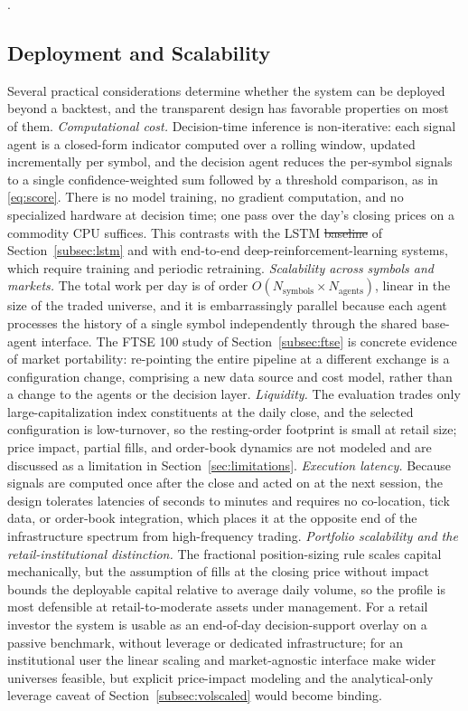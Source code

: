 \documentclass{ieeeaccess}
\providecommand{\DIFaddtex}[1]{{\protect\color{blue}\uwave{#1}}} %
\providecommand{\DIFdeltex}[1]{{\protect\color{red}\sout{#1}}}                      %
\providecommand{\DIFaddbegin}{} %
\providecommand{\DIFaddend}{} %
\providecommand{\DIFdelbegin}{} %
\providecommand{\DIFdelend}{} %
\providecommand{\DIFadd}[1]{\texorpdfstring{\DIFaddtex{#1}}{#1}} %
\providecommand{\DIFdel}[1]{\texorpdfstring{\DIFdeltex{#1}}{}} %
\newcommand{\DIFscaledelfig}{0.5}
\newlength{\DIFdelgraphicswidth} %
\newlength{\DIFdelgraphicsheight} %
\newcommand{\DIFaddincludegraphics}[2][]{{\color{blue}\fbox{\DIFOincludegraphics[#1]{#2}}}} %
\newcommand{\DIFdelincludegraphics}[2][]{%
\sbox{\DIFdelgraphicsbox}{\DIFOincludegraphics[#1]{#2}}%
\settoboxwidth{\DIFdelgraphicswidth}{\DIFdelgraphicsbox} %
\settoboxtotalheight{\DIFdelgraphicsheight}{\DIFdelgraphicsbox} %
\scalebox{\DIFscaledelfig}{%
\parbox[b]{\DIFdelgraphicswidth}{\usebox{\DIFdelgraphicsbox}\\[-\baselineskip] \rule{\DIFdelgraphicswidth}{0em}}\llap{\resizebox{\DIFdelgraphicswidth}{\DIFdelgraphicsheight}{%
\setlength{\unitlength}{\DIFdelgraphicswidth}%
\begin{picture}(1,1)%
\thicklines\linethickness{2pt} %
{\color[rgb]{1,0,0}\put(0,0){\framebox(1,1){}}}%
{\color[rgb]{1,0,0}\put(0,0){\line( 1,1){1}}}%
{\color[rgb]{1,0,0}\put(0,1){\line(1,-1){1}}}%
\end{picture}%
}\hspace*{3pt}}} %
} %
\DeclareRobustCommand{\DIFaddbegin}{\DIFOaddbegin \let\includegraphics\DIFaddincludegraphics} %
\DeclareRobustCommand{\DIFaddend}{\DIFOaddend \let\includegraphics\DIFOincludegraphics} %
\DeclareRobustCommand{\DIFdelbegin}{\DIFOdelbegin \let\includegraphics\DIFdelincludegraphics} %
\DeclareRobustCommand{\DIFdelend}{\DIFOaddend \let\includegraphics\DIFOincludegraphics} %
\begin{document}
\DIFaddbegin \DIFadd{on the risk axis with opaque learned models}\DIFaddend .

\subsection{Deployment and Scalability}
\label{subsec:deployment}

Several practical considerations determine whether the system can be deployed beyond a backtest, and the transparent design has favorable properties on most of them. \emph{Computational cost.} Decision-time inference is non-iterative: each signal agent is a closed-form indicator computed over a rolling window, updated incrementally per symbol, and the decision agent reduces the per-symbol signals to a single confidence-weighted sum followed by a threshold comparison, as in \eqref{eq:score}. There is no model training, no gradient computation, and no specialized hardware at decision time; one pass over the day's closing prices on a commodity CPU suffices. This contrasts with the LSTM \DIFdelbegin \DIFdel{baseline }\DIFdelend \DIFaddbegin \DIFadd{and GBM baselines }\DIFaddend of Section~\ref{subsec:lstm} and with end-to-end deep-reinforcement-learning systems, which require training and periodic retraining. \emph{Scalability across symbols and markets.} The total work per day is of order $O(N_\text{symbols} \times N_\text{agents})$, linear in the size of the traded universe, and it is embarrassingly parallel because each agent processes the history of a single symbol independently through the shared base-agent interface. The FTSE 100 study of Section~\ref{subsec:ftse} is concrete evidence of market portability: re-pointing the entire pipeline at a different exchange is a configuration change, comprising a new data source and cost model, rather than a change to the agents or the decision layer. \emph{Liquidity.} The evaluation trades only large-capitalization index constituents at the daily close, and the selected configuration is low-turnover, so the resting-order footprint is small at retail size; price impact, partial fills, and order-book dynamics are not modeled and are discussed as a limitation in Section~\ref{sec:limitations}. \emph{Execution latency.} Because signals are computed once after the close and acted on at the next session, the design tolerates latencies of seconds to minutes and requires no co-location, tick data, or order-book integration, which places it at the opposite end of the infrastructure spectrum from high-frequency trading. \emph{Portfolio scalability and the retail-institutional distinction.} The fractional position-sizing rule scales capital mechanically, but the assumption of fills at the closing price without impact bounds the deployable capital relative to average daily volume, so the profile is most defensible at retail-to-moderate assets under management. For a retail investor the system is usable as an end-of-day decision-support overlay on a passive benchmark, without leverage or dedicated infrastructure; for an institutional user the linear scaling and market-agnostic interface make wider universes feasible, but explicit price-impact modeling and the analytical-only leverage caveat of Section~\ref{subsec:volscaled} would become binding.
\end{document}
